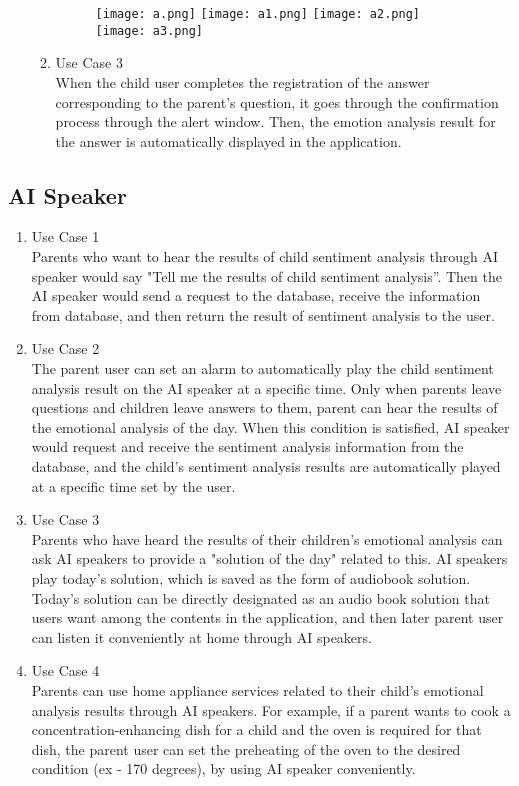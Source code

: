 \documentclass[conference]{IEEEtran}
\begin{document}
\begin{enumerate}
\begin{enumerate}
        \begin{figure}[H]
        \centering
        \texttt{[image: a.png]}
        \texttt{[image: a1.png]}
        \texttt{[image: a2.png]}
        \texttt{[image: a3.png]}
        \end{figure}
        \item Use Case 3
        \\When the child user completes the registration of the answer corresponding to the parent's question, it goes through the confirmation process through the alert window. Then, the emotion analysis result for the answer is automatically displayed in the application.
    \end{enumerate}
\end{enumerate}
\subsection{AI Speaker}
\begin{enumerate}
    \item Use Case 1 
    \\Parents who want to hear the results of child sentiment analysis through AI speaker would say "Tell me the results of child sentiment analysis”. Then the AI speaker would send a request to the database, receive the information from database, and then return the result of sentiment analysis to the user.
    \item Use Case 2
    \\The parent user can set an alarm to automatically play the child sentiment analysis result on the AI speaker at a specific time. Only when parents leave questions and children leave answers to them, parent can hear the results of the emotional analysis of the day. When this condition is satisfied, AI speaker would request and receive the sentiment analysis information from the database, and the child's sentiment analysis results are automatically played at a specific time set by the user.
    \item Use Case 3
    \\Parents who have heard the results of their children's emotional analysis can ask AI speakers to provide a "solution of the day" related to this. AI speakers play today's solution, which is saved as the form of audiobook solution. Today's solution can be directly designated as an audio book solution that users want among the contents in the application, and then later parent user can listen it conveniently at home through AI speakers.
    \item Use Case 4 
    \\Parents can use home appliance services related to their child's emotional analysis results through AI speakers. For example, if a parent wants to cook a concentration-enhancing dish for a child and the oven is required for that dish, the parent user can set the preheating of the oven to the desired condition (ex - 170 degrees), by using AI speaker conveniently.
\end{enumerate}
\end{document}
